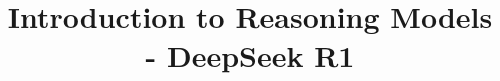 \documentclass[xcolor=dvipsnames,compress,t,pdf,9pt]{beamer}
\title[\insertframenumber /\inserttotalframenumber]{Introduction to Reasoning Models - DeepSeek R1}
\begin{document}
	\begin{frame}
	\titlepage
	\end{frame}
	

%	
	
	
\end{document}
